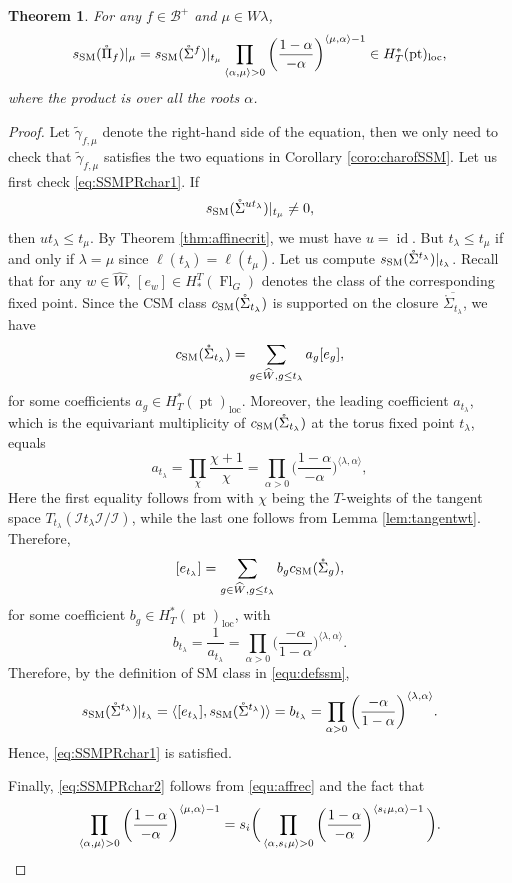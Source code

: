 \documentclass[12pt]{amsart}
\newtheorem{Th}{Theorem}[section]
\def\CSM{c_{\rm SM}}
\def\SSM{s_{\rm SM}}
\def\id{\operatorname{id}}
\def\pt{\operatorname{pt}}
\def\Fl{\operatorname{Fl}}
\def\loc{\operatorname{loc}}
\begin{document}
\begin{Th}\label{thm:pR=affine}
For any $f\in \mathcal{B}^+$ and $\mu\in W\lambda$,  
$$\SSM(\mathring{\Pi}_f)|_{\mu}
= \SSM(\mathring{\Sigma}^{f})|_{t_\mu}
\prod_{\langle\alpha,\mu\rangle>0}
\left(\frac{1-\alpha}{-\alpha}
\right)^{\langle \mu,\alpha \rangle-1}\in H_T^*(\pt)_{\loc},
$$
where the product is over all the roots $\alpha$.
\end{Th}
\begin{proof}
    Let $\tilde{\gamma}_{f,\mu}$ denote the right-hand side of the equation, then we only need to check that $\tilde{\gamma}_{f,\mu}$ satisfies the two equations in Corollary \ref{coro:charofSSM}. Let us first check \eqref{eq:SSMPRchar1}. If $$\SSM(\mathring{\Sigma}^{ut_\lambda})|_{t_\mu}\neq 0, $$
    then $ut_\lambda\leq t_\mu$. By Theorem \ref{thm:affinecrit}, we must have $u=\id$. But $t_\lambda\leq t_\mu$ if and only if $\lambda=\mu$ since $\ell(t_\lambda)=\ell(t_\mu)$. 
    Let us compute $\SSM(\mathring{\Sigma}^{t_\lambda})|_{t_\lambda}$. Recall that for any $w\in \widehat{W}$, $[e_w]\in H_*^T(\Fl_G)$ denotes the class of the corresponding fixed point. Since the CSM class $\CSM(\mathring{\Sigma}_{t_\lambda})$ is supported on the closure $\overline{\mathring{\Sigma}_{t_\lambda}}$,  we have
    \[\CSM(\mathring{\Sigma}_{t_\lambda})=\sum_{g\in \widehat{W}, g\leq t_\lambda}a_g[e_g],\]
    for some coefficients $a_g\in H_T^*(\pt)_{\loc}$. Moreover, the leading coefficient $a_{t_\lambda}$, which is the equivariant multiplicity of $\CSM(\mathring{\Sigma}_{t_\lambda})$ at the torus fixed point $t_\lambda$, equals
    \[a_{t_\lambda}=\prod_{\chi}\frac{\chi+1}{\chi}=\prod_{\alpha>0}\bigg(\frac{1-\alpha}{-\alpha}\bigg)^{\langle\lambda, \alpha\rangle},\]
    Here the first equality follows from \cite[Theorem 6.5]{MNS22} with $\chi$ being the $T$-weights of the tangent space $T_{t_\lambda}(\mathcal{I}t_\lambda \mathcal{I}/\mathcal{I})$,  while the last one follows from Lemma \ref{lem:tangentwt}. Therefore, 
    \[[e_{t_\lambda}]=\sum_{g\in \widehat{W}, g\leq t_\lambda} b_g \CSM(\mathring{\Sigma}_g),\]
    for some coefficient $b_g\in H_T^*(\pt)_{\loc}$, with 
    \[b_{t_\lambda}=\frac{1}{a_{t_\lambda}}=\prod_{\alpha>0}\bigg(\frac{-\alpha}{1-\alpha}\bigg)^{\langle\lambda, \alpha\rangle}.\]
    Therefore, by the definition of  SM class in  \eqref{equ:defssm},
    \[\SSM(\mathring{\Sigma}^{t_\lambda})|_{t_\lambda}=\langle[e_{t_\lambda}], \SSM(\mathring{\Sigma}^{t_\lambda})\rangle=b_{t_\lambda}=\prod_{\alpha>0}\bigg(\frac{-\alpha}{1-\alpha}\bigg)^{\langle\lambda, \alpha\rangle}.\]
    Hence,  \eqref{eq:SSMPRchar1} is satisfied.

    Finally,  \eqref{eq:SSMPRchar2} follows from \eqref{equ:affrec} and the fact that
    \[\prod_{\langle\alpha,\mu\rangle>0}\left(\frac{1-\alpha}{-\alpha}\right)^{\langle \mu,\alpha \rangle-1}=s_i\bigg(\prod_{\langle\alpha,s_i\mu\rangle>0}\left(\frac{1-\alpha}{-\alpha}\right)^{\langle s_i\mu,\alpha \rangle-1}\bigg).
    \qedhere\]
\end{proof}
\end{document}
